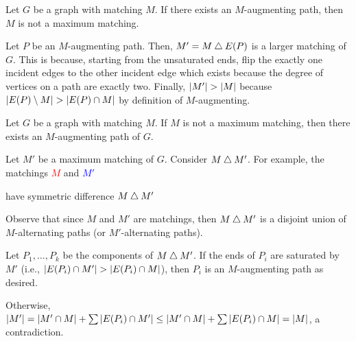 \begin{lemma}[8.1.1]\label{lem:811}
  Let $G$ be a graph with matching $M$.
  If there exists an $M$-augmenting path, then $M$ is not a maximum matching.
\end{lemma}
\begin{prf}
  Let $P$ be an $M$-augmenting path.
  Then, $M' = M \mathbin{\triangle} E(P)$ is a larger matching of $G$.
  This is because, starting from the unsaturated ends,
  flip the exactly one incident edges to the other incident edge
  which exists because the degree of vertices on a path are exactly two.
  Finally, $\abs{M'} > \abs{M}$ because $\abs{E(P) \setminus M} > \abs{E(P) \cap M}$
  by definition of $M$-augmenting.
\end{prf}

\begin{lemma}
  Let $G$ be a graph with matching $M$.
  If $M$ is not a maximum matching,
  then there exists an $M$-augmenting path of $G$.
\end{lemma}
\begin{prf}
  Let $M'$ be a maximum matching of $G$.
  Consider $M \mathbin{\triangle} M'$.
  For example, the matchings \textcolor{red}{$M$} and \textcolor{blue}{$M'$}
  \begin{center}
  \end{center}
  have symmetric difference \textcolor{violet}{$M \mathbin{\triangle} M'$}
  \begin{center}
  \end{center}
  Observe that since $M$ and $M'$ are matchings,
  then $M \mathbin{\triangle} M'$ is a disjoint union of $M$-alternating paths (or $M'$-alternating paths).

  Let $P_1,\dotsc,P_k$ be the components of $M \mathbin{\triangle} M'$.
  If the ends of $P_i$ are saturated by $M'$
  (i.e., $\abs{E(P_i) \cap M'} > \abs{E(P_i) \cap M}$),
  then $P_i$ is an $M$-augmenting path as desired.

  Otherwise, $\abs{M'} = \abs{M' \cap M} + \sum\abs{E(P_i) \cap M'}
    \leq \abs{M' \cap M} + \sum\abs{E(P_i) \cap M} = \abs{M}$,
  a contradiction.
\end{prf}

